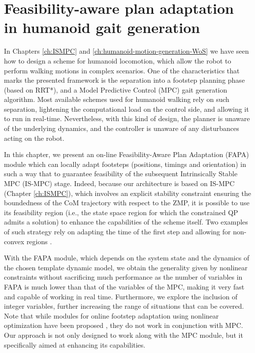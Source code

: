 \chapter{Feasibility-aware plan adaptation in humanoid gait generation}
\label{ch:FAPA}
In Chapters \ref{ch:ISMPC} and \ref{ch:humanoid-motion-generation-WoS} we have
seen how to design a scheme for humanoid locomotion, which allow 
the robot to perform walking motions in complex scenarios. One of the
characteristics that marks the presented framework is the separation into a 
footstep planning phase (based on RRT*), and a Model Predictive Control (MPC)
gait generation algorithm. Most available schemes used for humanoid walking 
rely on such separation, lightening the computational load on the control side,
and allowing it to run in real-time. Nevertheless, with this kind of design,
the planner is unaware of the underlying dynamics, and the controller is unaware
of any disturbances acting on the robot.

In this chapter, we present an on-line
Feasibility-Aware Plan Adaptation (FAPA) module which can locally adapt
footsteps (positions, timings and orientation) in such a way that to guarantee
feasibility of the subsequent Intrinsically Stable MPC (IS-MPC) stage.
Indeed, because our architecture is based on IS-MPC (Chapter \ref{ch:ISMPC}),
which involves an explicit stability constraint ensuring the boundedness of 
the CoM trajectory with respect to the ZMP, it is possible to use its
feasibility region (i.e., the state space region for which the constrained
QP admits a solution) to enhance the capabilities of the scheme itself.
Two examples of such strategy rely on adapting the time of the first step 
\cite{Smaldone2021FeasibilityDrivenSTA} and allowing for non-convex regions 
\cite{Habib2022HandlingNonConvex}. 

With the FAPA module, which depends on the system state and the dynamics
of the chosen template dynamic model, we obtain the generality given by
nonlinear constraints without sacrificing
much performance as the number of variables in FAPA is much lower than
that of the variables of the MPC, making it very fast and capable of working
in real time. Furthermore, we explore the inclusion of integer variables,
further increasing the range of situations that can be covered. Note that while modules for online
footstep adaptation using nonlinear
optimization have been proposed \cite{Ding2019IROS}, they do not work in
conjunction with MPC. Our approach is not only designed to work along
with the MPC module, but it specifically aimed at enhancing its capabilities.


